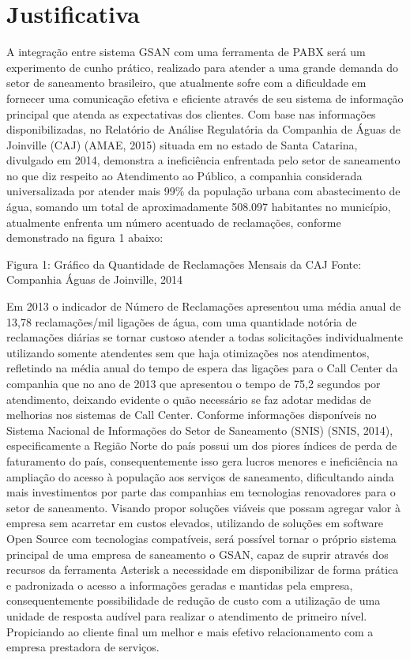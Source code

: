 \section{Justificativa}
A integração entre sistema GSAN com uma ferramenta de PABX será um experimento de cunho prático, realizado para atender a uma grande demanda do setor de saneamento brasileiro, que atualmente sofre com a dificuldade em fornecer uma comunicação efetiva e eficiente através de seu sistema de informação principal que atenda as expectativas dos clientes.
Com base nas informações disponibilizadas, no Relatório de Análise Regulatória da Companhia de Águas de Joinville (CAJ) (AMAE, 2015) situada em no estado de Santa Catarina, divulgado em 2014, demonstra a ineficiência enfrentada pelo setor de saneamento no que diz respeito ao Atendimento ao Público, a companhia considerada universalizada por atender mais 99\% da população urbana com abastecimento de água, somando um total de aproximadamente 508.097 habitantes no município, atualmente enfrenta um número acentuado de reclamações, conforme demonstrado na figura 1 abaixo:
 
Figura 1: Gráfico da Quantidade de Reclamações Mensais da CAJ
Fonte: Companhia Águas de Joinville, 2014

 Em 2013 o indicador de Número de Reclamações apresentou uma média anual de 13,78 reclamações/mil ligações de água, com uma quantidade notória de reclamações diárias se tornar custoso atender a todas solicitações individualmente utilizando somente atendentes sem que haja otimizações nos atendimentos, refletindo na média anual do tempo de espera das ligações para o Call Center da companhia que no ano de 2013 que apresentou o tempo de 75,2 segundos por atendimento, deixando evidente o quão necessário se faz adotar medidas de melhorias nos sistemas de Call Center. Conforme informações disponíveis no Sistema Nacional de Informações do Setor de Saneamento (SNIS) (SNIS, 2014), especificamente a Região Norte do país possui um dos piores índices de perda de faturamento do país, consequentemente isso gera lucros menores e ineficiência na ampliação do acesso à população aos serviços de saneamento, dificultando ainda mais investimentos por parte das companhias em tecnologias renovadores para o setor de saneamento. Visando propor soluções viáveis que possam agregar valor à empresa sem acarretar em custos elevados, utilizando de soluções em software Open Source com tecnologias compatíveis, será possível tornar o próprio sistema principal de uma empresa de saneamento o GSAN, capaz de suprir através dos recursos da ferramenta Asterisk a necessidade em disponibilizar de forma prática e padronizada o acesso a informações geradas e mantidas pela empresa, consequentemente possibilidade de redução de custo com a utilização de uma unidade de resposta audível para realizar o atendimento de primeiro nível. Propiciando ao cliente final um melhor e mais efetivo relacionamento com a empresa prestadora de serviços.

